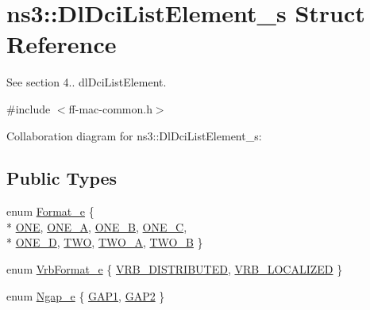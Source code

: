 \hypertarget{structns3_1_1DlDciListElement__s}{}\section{ns3\+:\+:Dl\+Dci\+List\+Element\+\_\+s Struct Reference}
\label{structns3_1_1DlDciListElement__s}


See section 4.. dl\+Dci\+List\+Element.  




{\ttfamily \#include $<$ff-\/mac-\/common.\+h$>$}



Collaboration diagram for ns3\+:\+:Dl\+Dci\+List\+Element\+\_\+s\+:
\subsection*{Public Types}
\begin{DoxyCompactItemize}
\item 
enum \hyperlink{structns3_1_1DlDciListElement__s_a5a9368fe0ff69530186a3a726e705176}{Format\+\_\+e} \{ \\*
\hyperlink{structns3_1_1DlDciListElement__s_a5a9368fe0ff69530186a3a726e705176a906cf31faee910b510da1eaa7b9a28ba}{O\+NE}, 
\hyperlink{structns3_1_1DlDciListElement__s_a5a9368fe0ff69530186a3a726e705176a74d521e96ee8f26c63667eefb1274f14}{O\+N\+E\+\_\+A}, 
\hyperlink{structns3_1_1DlDciListElement__s_a5a9368fe0ff69530186a3a726e705176a99171d050a5629c3ab1fa0e37f60d1fe}{O\+N\+E\+\_\+B}, 
\hyperlink{structns3_1_1DlDciListElement__s_a5a9368fe0ff69530186a3a726e705176a9ffcd456c9ba41c012414a243fd5833b}{O\+N\+E\+\_\+C}, 
\\*
\hyperlink{structns3_1_1DlDciListElement__s_a5a9368fe0ff69530186a3a726e705176a88e3ce34a039179ea5afe509d5542ea1}{O\+N\+E\+\_\+D}, 
\hyperlink{structns3_1_1DlDciListElement__s_a5a9368fe0ff69530186a3a726e705176ae7f2b6bc57234c7b3dde2adb4f26981b}{T\+WO}, 
\hyperlink{structns3_1_1DlDciListElement__s_a5a9368fe0ff69530186a3a726e705176a93d503a24332ecf9d0bf774ed75d5ee6}{T\+W\+O\+\_\+A}, 
\hyperlink{structns3_1_1DlDciListElement__s_a5a9368fe0ff69530186a3a726e705176afe5c06a3f63f0a0867911041155881ec}{T\+W\+O\+\_\+B}
 \}
\item 
enum \hyperlink{structns3_1_1DlDciListElement__s_a5386f2af7d6d283f6f885267f4b5a110}{Vrb\+Format\+\_\+e} \{ \hyperlink{structns3_1_1DlDciListElement__s_a5386f2af7d6d283f6f885267f4b5a110a014194696078506aabe3884243b76178}{V\+R\+B\+\_\+\+D\+I\+S\+T\+R\+I\+B\+U\+T\+ED}, 
\hyperlink{structns3_1_1DlDciListElement__s_a5386f2af7d6d283f6f885267f4b5a110aca59c75a0c251ddb63bf518df2fe5061}{V\+R\+B\+\_\+\+L\+O\+C\+A\+L\+I\+Z\+ED}
 \}
\item 
enum \hyperlink{structns3_1_1DlDciListElement__s_a39b204f51a179e4de9d1d9883403116c}{Ngap\+\_\+e} \{ \hyperlink{structns3_1_1DlDciListElement__s_a39b204f51a179e4de9d1d9883403116caf4f6971c10101d74b5e433870badd4fd}{G\+A\+P1}, 
\hyperlink{structns3_1_1DlDciListElement__s_a39b204f51a179e4de9d1d9883403116cadaf91fe2ad8190ba2ffa6c5974938756}{G\+A\+P2}
 \}
\end{DoxyCompactItemize}
